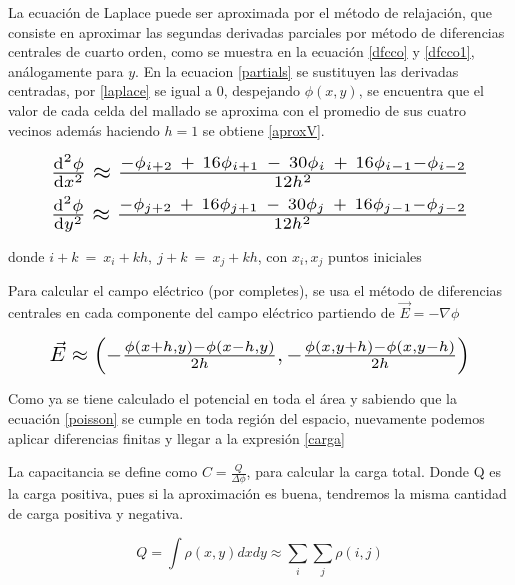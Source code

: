 


La ecuación de Laplace puede ser aproximada por el método de relajación, que consiste en aproximar las segundas derivadas parciales por método de diferencias centrales de cuarto orden, como se muestra en la ecuación \ref{dfcco} y \ref{dfcco1}, análogamente para $y$. En la ecuacion \ref{partials} se sustituyen las derivadas centradas, por \ref{laplace} se igual a 0, despejando $\phi(x,y)$, se encuentra que  el valor de cada celda del mallado se aproxima con el promedio de sus cuatro vecinos además haciendo $h=1$ se obtiene \ref{aproxV}.

\begin{equation}
\label{dfcco1}
\resizebox{.9\columnwidth }{!}{
$\dv[2]{\phi}{x} \approx \frac{-\phi_{i+2}\ +\ 16\phi_{i+1}\ -\ 30\phi_{i}\ +\ 16\phi_{i-1} -\phi_{i-2} }{12h^{2}} $
}
\end{equation}
\begin{equation}
\label{dfcco}
\resizebox{.9\columnwidth }{!}{
$\dv[2]{\phi}{y} \approx \frac{-\phi_{j+2}\ +\ 16\phi_{j+1}\ -\ 30\phi_{j}\ +\ 16\phi_{j-1} -\phi_{j-2} }{12h^{2}} $
}
\end{equation}

\noindent \small{donde $i+k\ =\ x_{i}+kh,\ j+k\ =\ x_{j}+kh $, con $x_{i}, x_{j}$ puntos  iniciales} 

\vspace{\baselineskip}


Para calcular el campo eléctrico (por completes), se usa el método de diferencias centrales en cada componente del campo eléctrico partiendo de $\vec{E}=-\nabla \phi$

\begin{equation}
\label{E}
\resizebox{.9\columnwidth }{!}{
$\vec{E} \approx \left( -\frac{\phi(x+h,y)-\phi(x-h,y)}{2h},-\frac{\phi(x,y+h)-\phi(x,y-h)}{2h}\right) $
}
\end{equation}



Como ya se tiene calculado el potencial en toda el área y sabiendo que la ecuación \ref{poisson} se cumple en toda región del espacio, nuevamente podemos aplicar diferencias finitas y llegar a la expresión \ref{carga}

\begin{comment}
   \begin{equation}
\label{carga}
 -\frac{\rho(x,y)}{\epsilon_0} \approx \frac{\phi(x+h,y)+\phi(x-h,z)+\phi(x,y+h)+\phi(x,y-h)-4\phi(x,y)}{h^2}
\end{equation}  
\end{comment}

La capacitancia se define como $C=\frac{Q}{\Delta \phi}$, para calcular la carga total. Donde Q es la carga positiva, pues si la aproximación es buena, tendremos la misma cantidad de carga positiva y negativa. 

\begin{equation}
    \label{cargatotal}
    Q = \int \rho(x,y) dxdy \approx \sum_i \sum_j \rho(i,j) 
\end{equation}